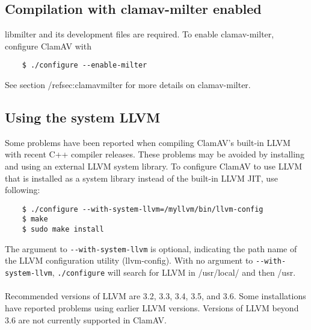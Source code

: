 \documentclass[a4paper,titlepage,12pt]{article}
\begin{document}
    \subsection{Compilation with clamav-milter enabled}
    libmilter and its development files are required. To enable clamav-milter,
    configure ClamAV with
    \begin{verbatim}
	$ ./configure --enable-milter
    \end{verbatim}
    See section /ref{sec:clamavmilter} for more details on clamav-milter.

    \subsection{Using the system LLVM}
    Some problems have been reported when compiling ClamAV's built-in LLVM with recent
    C++ compiler releases. These problems may be avoided by installing and using
    an external LLVM system library. To configure ClamAV to use LLVM that is installed
    as a system library instead of the built-in LLVM JIT, use following: 
    \begin{verbatim}
	$ ./configure --with-system-llvm=/myllvm/bin/llvm-config
	$ make
	$ sudo make install
    \end{verbatim}
    The argument to \verb+--with-system-llvm+ is optional, indicating the path name of
    the LLVM configuration utility (llvm-config). With no argument to \verb+--with-system-llvm+,
    \verb+./configure+ will search for LLVM in /usr/local/ and then /usr.
    \\\\
    Recommended versions of LLVM are 3.2, 3.3, 3.4, 3.5, and 3.6. Some installations have
    reported problems using earlier LLVM versions. Versions of LLVM beyond 3.6 are not
    currently supported in ClamAV.
\end{document}
